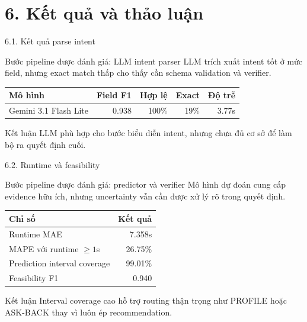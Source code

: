 \section{6. Kết quả và thảo luận}

\begin{frame}[t]{6.1. Kết quả parse intent}
\small
\begin{block}{Bước pipeline được đánh giá: LLM intent parser}
LLM trích xuất intent tốt ở mức field, nhưng exact match thấp cho thấy cần schema validation và verifier.
\end{block}
\centering
\begin{tabular}{lrrrr}
\toprule
\textbf{Mô hình} & \textbf{Field F1} & \textbf{Hợp lệ} & \textbf{Exact} & \textbf{Độ trễ} \\
\midrule
Gemini 3.1 Flash Lite & 0.938 & 100\% & 19\% & 3.77s \\
\bottomrule
\end{tabular}
\vspace{0.35cm}
\begin{exampleblock}{Kết luận}
LLM phù hợp cho bước biểu diễn intent, nhưng chưa đủ cơ sở để làm bộ ra quyết định cuối.
\end{exampleblock}
\end{frame}

\begin{frame}[t]{6.2. Runtime và feasibility}
\small
\begin{block}{Bước pipeline được đánh giá: predictor và verifier}
Mô hình dự đoán cung cấp evidence hữu ích, nhưng uncertainty vẫn cần được xử lý rõ trong quyết định.
\end{block}
\centering
\begin{tabular}{lr}
\toprule
\textbf{Chỉ số} & \textbf{Kết quả} \\
\midrule
Runtime MAE & 7.358s \\
MAPE với runtime $\geq 1$s & 26.75\% \\
Prediction interval coverage & 99.01\% \\
Feasibility F1 & 0.940 \\
\bottomrule
\end{tabular}
\vspace{0.25cm}
\begin{exampleblock}{Kết luận}
Interval coverage cao hỗ trợ routing thận trọng như PROFILE hoặc ASK-BACK thay vì luôn ép recommendation.
\end{exampleblock}
\end{frame}

